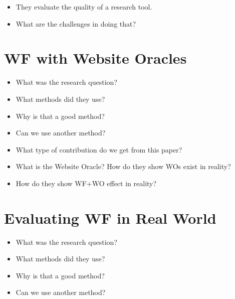 \begin{frame}
  \begin{question}
    \begin{itemize}
      \item They evaluate the quality of a research tool.
      \item What are the challenges in doing that?
    \end{itemize}
  \end{question}
\end{frame}


\section{WF with Website Oracles}

\begin{frame}
  \begin{question}
    \begin{itemize}
      \item What was the research question?
      \item What methods did they use?
      \item Why is that a good method?
      \item Can we use another method?
    \end{itemize}
  \end{question}
\end{frame}

\begin{frame}
  \begin{question}
    \begin{itemize}
      \item<+> What type of contribution do we get from this paper?
      \item<+> What is the Website Oracle? How do they show WOs exist in 
        reality?
      \item<+> How do they show WF+WO effect in reality?
    \end{itemize}
  \end{question}
\end{frame}


\section{Evaluating WF in Real World}

\begin{frame}
  \begin{question}
    \begin{itemize}
      \item What was the research question?
      \item What methods did they use?
      \item Why is that a good method?
      \item Can we use another method?
    \end{itemize}
  \end{question}
\end{frame}

